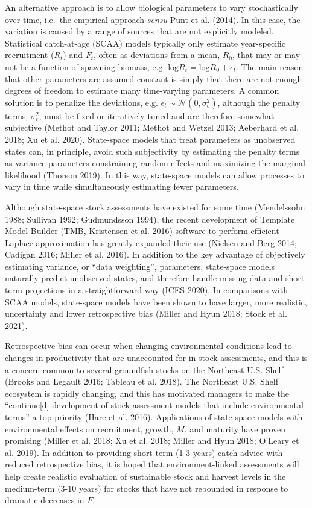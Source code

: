 \documentclass[]{article}
\begin{document}
An alternative approach is to allow biological parameters to vary
stochastically over time, i.e.~the empirical approach \emph{sensu} Punt
et al. (2014). In this case, the variation is caused by a range of
sources that are not explicitly modeled. Statistical catch-at-age (SCAA)
models typically only estimate year-specific recruitment (\(R_t\)) and
\(F_t\), often as deviations from a mean, \(R_0\), that may or may not
be a function of spawning biomass, e.g.
\(\text{log}R_t = \text{log}R_0 + \epsilon_t\). The main reason that
other parameters are assumed constant is simply that there are not
enough degrees of freedom to estimate many time-varying parameters. A
common solution is to penalize the deviations, e.g.
\(\epsilon_t \sim \mathcal{N}(0,\sigma^2_\epsilon)\), although the
penalty terms, \(\sigma^2_\epsilon\), must be fixed or iteratively tuned
and are therefore somewhat subjective (Methot and Taylor 2011; Methot
and Wetzel 2013; Aeberhard et al. 2018; Xu et al. 2020). State-space
models that treat parameters as unobserved states can, in principle,
avoid such subjectivity by estimating the penalty terms as variance
parameters constraining random effects and maximizing the marginal
likelihood (Thorson 2019). In this way, state-space models can allow
processes to vary in time while simultaneously estimating fewer
parameters.

Although state-space stock assessments have existed for some time
(Mendelssohn 1988; Sullivan 1992; Gudmundsson 1994), the recent
development of Template Model Builder (TMB, Kristensen et al. 2016)
software to perform efficient Laplace approximation has greatly expanded
their use (Nielsen and Berg 2014; Cadigan 2016; Miller et al. 2016). In
addition to the key advantage of objectively estimating variance, or
``data weighting'', parameters, state-space models naturally predict
unobserved states, and therefore handle missing data and short-term
projections in a straightforward way (ICES 2020). In comparisons with
SCAA models, state-space models have been shown to have larger, more
realistic, uncertainty and lower retrospective bias (Miller and Hyun
2018; Stock et al. 2021).

Retrospective bias can occur when changing environmental conditions lead
to changes in productivity that are unaccounted for in stock
assessments, and this is a concern common to several groundfish stocks
on the Northeast U.S. Shelf (Brooks and Legault 2016; Tableau et al.
2018). The Northeast U.S. Shelf ecosystem is rapidly changing, and this
has motivated managers to make the ``continue{[}d{]} development of
stock assessment models that include environmental terms'' a top
priority (Hare et al. 2016). Applications of state-space models with
environmental effects on recruitment, growth, \(M\), and maturity have
proven promising (Miller et al. 2018; Xu et al. 2018; Miller and Hyun
2018; O'Leary et al. 2019). In addition to providing short-term (1-3
years) catch advice with reduced retrospective bias, it is hoped that
environment-linked assessments will help create realistic evaluation of
sustainable stock and harvest levels in the medium-term (3-10 years) for
stocks that have not rebounded in response to dramatic decreases in
\(F\).
\end{document}
